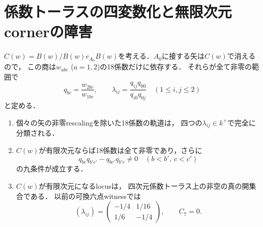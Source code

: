 \section{係数トーラスの四変数化と無限次元cornerの障害}
\label{sec:torus}
$C(w)=B(w)/B(w)e_{A_0}B(w)$を考える．$A_0$に接する矢は$C(w)$で消えるので，
この商は$w_{abc}$ ($a=1,2$)の18係数だけに依存する．
それらが全て非零の範囲で
\[
q_{bc}=\frac{w_{2bc}}{w_{1bc}},\qquad
\lambda_{ij}=\frac{q_{ij}q_{00}}{q_{i0}q_{0j}}
\quad(1\le i,j\le2)
\]
と定める．
\begin{theorem}[四交比と九つの必要条件]\label{thm:torus}
\begin{enumerate}
\item 個々の矢の非零rescalingを除いた18係数の軌道は，
四つの$\lambda_{ij}\in k^\times$で完全に分類される．
\item $C(w)$が有限次元ならば18係数は全て非零であり，さらに
\begin{equation}\label{eq:minor}
q_{bc}q_{b'c'}-q_{bc'}q_{b'c}\ne0
\quad(b<b',\ c<c')
\end{equation}
の九条件が成立する．
\item $C(w)$が有限次元になるlocusは，
四次元係数トーラス上の非空の真の開集合である．
以前の可換六点witnessでは
\[
(\lambda_{ij})=
\begin{pmatrix}-1/4&1/16\\1/6&-1/4\end{pmatrix},\qquad C_7=0.
\]
\end{enumerate}
\end{theorem}
